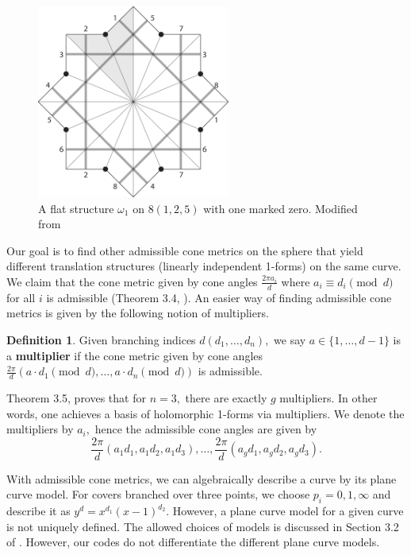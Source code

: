 \documentclass[12pt,reqno]{amsart}
\theoremstyle{definition}
\newtheorem{defn}{Definition}
\theoremstyle{remark}
\begin{document}
\begin{figure}[htbp]
   \centering
   \includegraphics[width=2.5in]{figures/125_flat.pdf} 
  \caption{A flat structure $\omega_1$ on $8(1, 2, 5)$ with one marked zero. Modified from \cite{dami}}
  \label{fig:125_flat}
\end{figure}

Our goal is to find other admissible cone metrics on the sphere that yield different translation structures (linearly independent 1-forms) on the same curve. We claim that the cone metric given by cone angles $\frac{2 \pi a_i}{d}$ where $a_i \equiv d_i \pmod d$ for all $i$ is admissible (Theorem 3.4, \cite{dthesis}). An easier way of finding admissible cone metrics is given by the following notion of multipliers.

\begin{defn} Given branching indices $d (d_1, \ldots , d_n),$ we say $a \in \{1, \ldots, d - 1\}$ is a \textbf{multiplier} if the cone metric given by cone angles $\frac{2 \pi}{d} (a \cdot d_1 \pmod d, \ldots , a \cdot d_n \pmod d)$ is admissible. 
\end{defn}

Theorem 3.5, \cite{dthesis} proves that for $n = 3,$ there are exactly $g$ multipliers. In other words, one achieves a basis of holomorphic 1-forms via multipliers. We denote the multipliers by $a_i,$ hence the admissible cone angles are given by $$\frac{2\pi}{d}(a_1 d_1, a_1 d_2, a_1 d_3), \ldots , \frac{2\pi}{d}(a_g d_1, a_g d_2, a_g d_3).$$ 

With admissible cone metrics, we can algebraically describe a curve by its plane curve model. For covers branched over three points, we choose $p_i = 0, 1, \infty$ and describe it as $y^d = x^{d_1} (x-1)^{d_2}.$ However, a plane curve model for a given curve is not uniquely defined. The allowed choices of models is discussed in Section 3.2 of \cite{dthesis}. However, our codes do not differentiate the different plane curve models.
\end{document}
